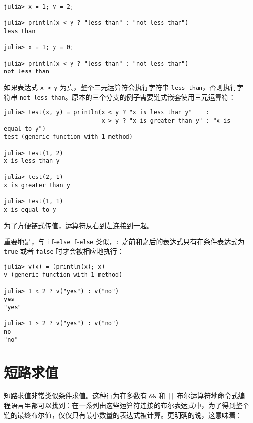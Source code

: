 \begin{verbatim}
julia> x = 1; y = 2;

julia> println(x < y ? "less than" : "not less than")
less than

julia> x = 1; y = 0;

julia> println(x < y ? "less than" : "not less than")
not less than
\end{verbatim}



如果表达式 \texttt{x < y} 为真，整个三元运算符会执行字符串 \texttt{{\textquotedbl}less than{\textquotedbl}}，否则执行字符串 \texttt{{\textquotedbl}not less than{\textquotedbl}}。原本的三个分支的例子需要链式嵌套使用三元运算符：




\begin{verbatim}
julia> test(x, y) = println(x < y ? "x is less than y"    :
                            x > y ? "x is greater than y" : "x is equal to y")
test (generic function with 1 method)

julia> test(1, 2)
x is less than y

julia> test(2, 1)
x is greater than y

julia> test(1, 1)
x is equal to y
\end{verbatim}



为了方便链式传值，运算符从右到左连接到一起。



重要地是，与 \texttt{if}-\texttt{elseif}-\texttt{else} 类似，\texttt{:} 之前和之后的表达式只有在条件表达式为 \texttt{true} 或者 \texttt{false} 时才会被相应地执行：




\begin{verbatim}
julia> v(x) = (println(x); x)
v (generic function with 1 method)

julia> 1 < 2 ? v("yes") : v("no")
yes
"yes"

julia> 1 > 2 ? v("yes") : v("no")
no
"no"
\end{verbatim}



\hypertarget{736299957672008833}{}


\section{短路求值}



短路求值非常类似条件求值。这种行为在多数有 \texttt{\&\&} 和 \texttt{||} 布尔运算符地命令式编程语言里都可以找到：在一系列由这些运算符连接的布尔表达式中，为了得到整个链的最终布尔值，仅仅只有最小数量的表达式被计算。更明确的说，这意味着：



